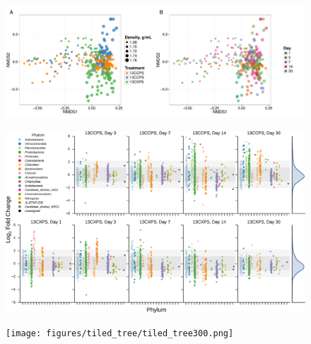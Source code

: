 \thispagestyle{empty}


\begin{figure}[H] \begin{center}
    \centerline{\includegraphics[width=15.4cm]{figures/ordination_all1/ordination_all.pdf}}
    \caption{\protect}\label{fig:ord}
\end{center} \end{figure}


\begin{figure}[H]
	\begin{center}
	\centerline{\includegraphics[width=15.4cm]{figures/l2fc_fig1/l2fc_fig300.png}}
	\caption{\protect}\label{fig:l2fc}
        \end{center}
\end{figure}

\begin{figure}[H]
	\begin{center}
    \centerline{\texttt{[image: figures/tiled\_tree/tiled\_tree300.png]}}
    \caption[Phylogenetic trees]{\protect}\label{fig:tiledtree}
    \end{center} 
\end{figure}

